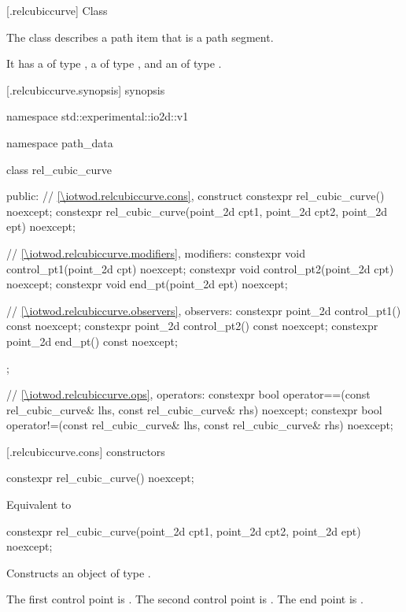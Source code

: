  [\iotwod.relcubiccurve] {Class }

\pnum
{}%
The class  describes a path item that is a path segment.

\pnum
It has a  of type , a  of type , and an  of type .

 [\iotwod.relcubiccurve.synopsis] { synopsis}

\begin{codeblock}
namespace std::experimental::io2d::v1 {
  namespace path_data {
    class rel_cubic_curve {
    public:
      // \ref{\iotwod.relcubiccurve.cons}, construct
      constexpr rel_cubic_curve() noexcept;
      constexpr rel_cubic_curve(point_2d cpt1, point_2d cpt2,
        point_2d ept) noexcept;

      // \ref{\iotwod.relcubiccurve.modifiers}, modifiers:
      constexpr void control_pt1(point_2d cpt) noexcept;
      constexpr void control_pt2(point_2d cpt) noexcept;
      constexpr void end_pt(point_2d ept) noexcept;

      // \ref{\iotwod.relcubiccurve.observers}, observers:
      constexpr point_2d control_pt1() const noexcept;
      constexpr point_2d control_pt2() const noexcept;
      constexpr point_2d end_pt() const noexcept;
    };
    
    // \ref{\iotwod.relcubiccurve.ops}, operators:
    constexpr bool operator==(const rel_cubic_curve& lhs,
      const rel_cubic_curve& rhs) noexcept;
    constexpr bool operator!=(const rel_cubic_curve& lhs,
      const rel_cubic_curve& rhs) noexcept;
  }
}
\end{codeblock}

 [\iotwod.relcubiccurve.cons] { constructors}

%
\begin{itemdecl}
constexpr rel_cubic_curve() noexcept;
\end{itemdecl}
\begin{itemdescr}
\pnum
\effects
Equivalent to 
\end{itemdescr}

%
\begin{itemdecl}
constexpr rel_cubic_curve(point_2d cpt1, point_2d cpt2,
  point_2d ept) noexcept;
\end{itemdecl}
\begin{itemdescr}
\pnum
\effects
Constructs an object of type .

\pnum
The first control point is . The second control point is . The end point is .
\end{itemdescr}

